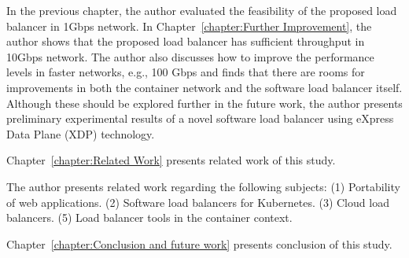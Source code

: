 

In the previous chapter, the author evaluated the feasibility of the proposed load balancer in 1Gbps network.
In Chapter~\ref{chapter:Further Improvement}, the author shows that the proposed load balancer has sufficient throughput in 10Gbps network.
The author also discusses how to improve the performance levels in faster networks, e.g., 100 Gbps and finds that there are rooms for improvements in both the container network and the software load balancer itself.
Although these should be explored further in the future work, the author presents preliminary experimental results of a novel software load balancer using eXpress Data Plane (XDP) technology.



Chapter~\ref{chapter:Related Work} presents related work of this study.
%

The author presents related work regarding the following subjects:
(1) Portability of web applications.
(2) Software load balancers for Kubernetes.
(3) Cloud load balancers.
(5) Load balancer tools in the container context.



%
Chapter~\ref{chapter:Conclusion and future work} presents conclusion of this study.



